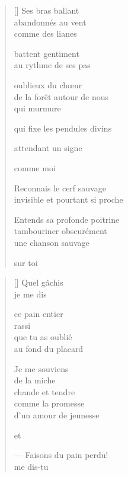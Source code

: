 \documentclass[12pt,a4paper]{article}
\begin{document}
\poemtitle{}

\settowidth{\versewidth}{invisible et pourtant si proche}

\bigskip

\begin{verse}[\versewidth]
  Ses bras ballant \\
  abandonnés au vent \\
  comme des lianes

  battent gentiment \\
  au rythme de ses pas

  oublieux du chœur \\
  de la forêt autour de nous \\
  qui murmure

  qui fixe les pendules divins

  attendant un signe

  comme moi

  Reconnais le cerf sauvage \\
  invisible et pourtant si proche

  Entends sa profonde poitrine \\
  tambouriner obscurément \\
  une chanson sauvage

  sur toi
\end{verse}


\newpage

\poemtitle{}

\settowidth{\versewidth}{--- Faisons du pain perdu!}

\bigskip

\begin{verse}[\versewidth]
  Quel gâchis \\
  je me dis

  ce pain entier \\
  rassi \\
  que tu as oublié \\
  au fond du placard

  Je me souviens \\
  de la miche \\
  chaude et tendre \\
  comme la promesse \\
  d'un amour de jeunesse

  et

  --- Faisons du pain perdu! \\
  me dis-tu
\end{verse}
\end{document}
